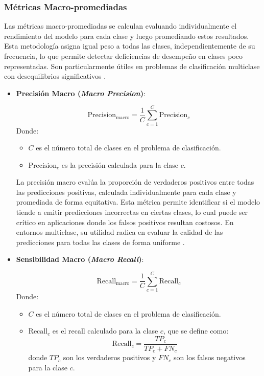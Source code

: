 \subsubsection*{Métricas Macro-promediadas}

Las métricas macro-promediadas se calculan evaluando individualmente el rendimiento del modelo para cada clase y luego promediando estos resultados. Esta metodología asigna igual peso a todas las clases, independientemente de su frecuencia, lo que permite detectar deficiencias de desempeño en clases poco representadas. Son particularmente útiles en problemas de clasificación multiclase con desequilibrios significativos \cite{Japkowicz2002}.

\begin{itemize}

\item \textbf{Precisión Macro (\textit{Macro Precision})}:

\begin{equation}
\text{Precision}_{\text{macro}} = \frac{1}{C} \sum_{c=1}^{C} \text{Precision}_c
\end{equation}
Donde:
\begin{itemize}
    \item \( C \) es el número total de clases en el problema de clasificación.
    \item \( \text{Precision}_c \) es la precisión calculada para la clase \( c \).
\end{itemize}

La precisión macro evalúa la proporción de verdaderos positivos entre todas las predicciones positivas, calculada individualmente para cada clase y promediada de forma equitativa. Esta métrica permite identificar si el modelo tiende a emitir predicciones incorrectas en ciertas clases, lo cual puede ser crítico en aplicaciones donde los falsos positivos resultan costosos. En entornos multiclase, su utilidad radica en evaluar la calidad de las predicciones para todas las clases de forma uniforme \cite{He2009}.

\item \textbf{Sensibilidad Macro (\textit{Macro Recall})}:

\begin{equation}
\text{Recall}_{\text{macro}} = \frac{1}{C} \sum_{c=1}^{C} \text{Recall}_c
\end{equation}
Donde:
\begin{itemize}
    \item \( C \) es el número total de clases en el problema de clasificación.
    \item \( \text{Recall}_c \) es el recall calculado para la clase \( c \), que se define como:
    \[
    \text{Recall}_c = \frac{TP_c}{TP_c + FN_c}
    \]
    donde \( TP_c \) son los verdaderos positivos y \( FN_c \) son los falsos negativos para la clase \( c \).
\end{itemize}


\end{itemize}
